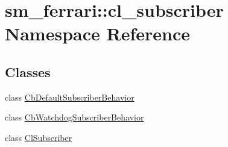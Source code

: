\hypertarget{namespacesm__ferrari_1_1cl__subscriber}{}\section{sm\+\_\+ferrari\+:\+:cl\+\_\+subscriber Namespace Reference}
\label{namespacesm__ferrari_1_1cl__subscriber}
\subsection*{Classes}
\begin{DoxyCompactItemize}
\item 
class \hyperlink{classsm__ferrari_1_1cl__subscriber_1_1CbDefaultSubscriberBehavior}{Cb\+Default\+Subscriber\+Behavior}
\item 
class \hyperlink{classsm__ferrari_1_1cl__subscriber_1_1CbWatchdogSubscriberBehavior}{Cb\+Watchdog\+Subscriber\+Behavior}
\item 
class \hyperlink{classsm__ferrari_1_1cl__subscriber_1_1ClSubscriber}{Cl\+Subscriber}
\end{DoxyCompactItemize}

